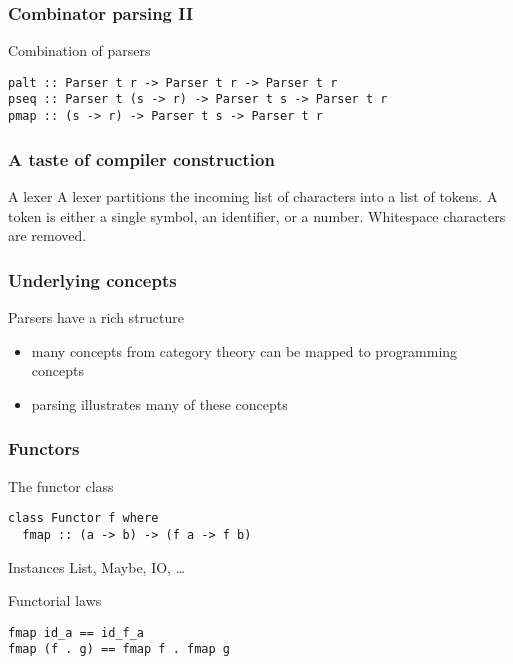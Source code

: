 \documentclass{beamer}
\begin{document}
\begin{frame}[fragile]
  \frametitle{Combinator parsing II}
  \begin{block}{Combination of parsers}
\begin{verbatim}
palt :: Parser t r -> Parser t r -> Parser t r
pseq :: Parser t (s -> r) -> Parser t s -> Parser t r
pmap :: (s -> r) -> Parser t s -> Parser t r
\end{verbatim}
\end{block}     
\end{frame}             


\begin{frame}[fragile]
  \frametitle{A taste of compiler construction}
\begin{block}{A lexer}
 A lexer partitions the incoming list of
 characters into a list of tokens. A token is either a single symbol, 
 an identifier, or a number. Whitespace characters are removed.
\end{block}
\end{frame}     


\begin{frame}[fragile]
  \frametitle{Underlying concepts}
  \begin{alertblock}{Parsers have a rich structure}
    \begin{itemize}
    \item many concepts from category theory can be mapped to programming concepts
    \item parsing illustrates many of these concepts
    \end{itemize}
  \end{alertblock}
\end{frame}             


\begin{frame}[fragile]
  \frametitle{Functors}
  \begin{alertblock}{The functor class}
\begin{verbatim}
class Functor f where
  fmap :: (a -> b) -> (f a -> f b)
\end{verbatim}  
\end{alertblock}

\begin{exampleblock}{Instances}
  List, Maybe, IO, \dots
\end{exampleblock}
\begin{alertblock}{Functorial laws}
\begin{verbatim}
fmap id_a == id_f_a
fmap (f . g) == fmap f . fmap g
\end{verbatim}
\end{alertblock}
\end{frame}             
\end{document}
